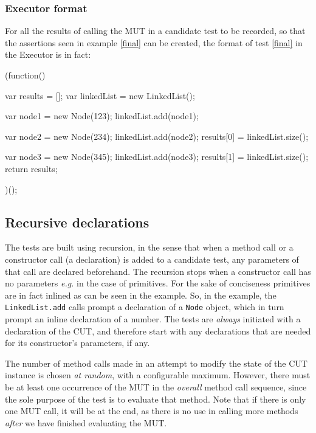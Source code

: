 \subsubsection{Executor format}

For all the results of calling the MUT in a candidate test to be recorded, so that the assertions seen in example \ref{final} can be created, the format of test \ref{final} in the \textsf{Executor} is in fact:

\begin{code}[caption=Executor format,label=execformat]
(function() {
   var results = [];
   var linkedList = new LinkedList();

   var node1 = new Node(123);
   linkedList.add(node1);

   var node2 = new Node(234);
   linkedList.add(node2);
   results[0] = linkedList.size();

   var node3 = new Node(345);
   linkedList.add(node3);
   results[1] = linkedList.size();
   return results;
})();
\end{code}

\subsection{Recursive declarations}

The tests are built using recursion, in the sense that when a method call or a constructor call (a declaration) is added to a candidate test, any parameters of that call are declared beforehand. The recursion stops when a constructor call has no parameters \emph{e.g.} in the case of primitives. For the sake of conciseness primitives are in fact inlined as can be seen in the example. So, in the example, the \texttt{LinkedList.add} calls prompt a declaration of a \texttt{Node} object, which in turn prompt an inline declaration of a number.
The tests are \emph{always} initiated with a declaration of the CUT, and therefore start with any declarations that are needed for its constructor's parameters, if any.

The number of method calls made in an attempt to modify the state of the CUT instance is chosen \emph{at random}, with a configurable maximum. However, there must be at least one occurrence of the MUT in the \emph{overall} method call sequence, since the sole purpose of the test is to evaluate that method. Note that if there is only one MUT call, it will be at the end, as there is no use in calling more methods \emph{after} we have finished evaluating the MUT.


